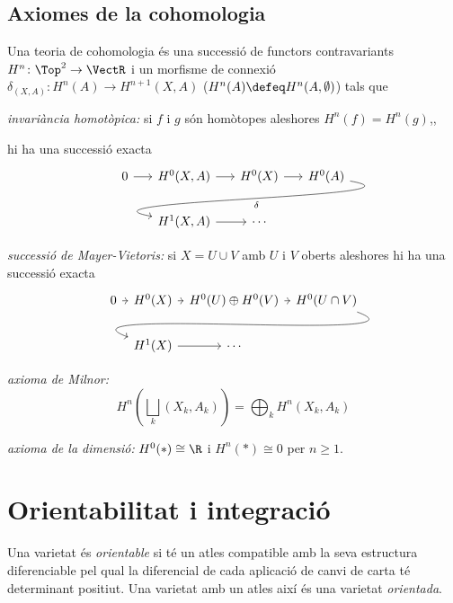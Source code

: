 \documentclass[12pt,twocolumn]{article}
\begin{document}
\subsection{Axiomes de la cohomologia}
Una teoria de cohomologia és una successió de functors contravariants \( H^n \colon \Top^2
\to \VectR \) i un morfisme de connexió \( \delta_{(X,A)} \colon H^n(A) \to
H^{n+1}(X,A) \) (\( H^n(A) \defeq H^n(A,\emptyset) \)) tals que   
\begin{points}
\item \emph{invariància homotòpica:} si \( f \) i \( g \) són homòtopes aleshores \( H^n(f) = H^n(g) \),,
\item hi ha una successió exacta
	\begin{equation*}
		\begin{tikzcd}[column sep = 15]
			0 \arrow[r] & H^0(X,A) \arrow[r] & H^0(X) \arrow[r] & H^0(A) \arrow[dll, "\delta",
			out = -10, in = 170, looseness = 1.2, overlay] \\
				& H^1(X,A) \arrow[r] & \cdots
		\end{tikzcd}
	\end{equation*}
\item \emph{successió de Mayer-Vietoris:} si \( X = U \cup V \) amb \( U \) i \( V \)
	oberts aleshores hi ha una successió exacta	
	\begin{equation*}
		\begin{tikzcd}[column sep = 5]
			0 \arrow[r] & H^0(X) \arrow[r] & H^0(U) \oplus H^0(V) \arrow[r] & H^0(U \cap V)
			\arrow[dll,	out = -20, in = 160, overlay] \\
									& H^1(X) \arrow[r] & \cdots
		\end{tikzcd}
	\end{equation*}
\item \emph{axioma de Milnor:} 
	\begin{equation*}
		H^n\left(\bigsqcup_{k}(X_k, A_k)\right) = \bigoplus_{k}H^n(X_k,A_k) 
	\end{equation*}
\item \emph{axioma de la dimensió:} \( H^0(\ast) \cong \R \) i \( H^n(\ast) \cong 0 \) per
	\( n \geq 1 \). 
	
\end{points}

\section{Orientabilitat i integració}
\begin{definition}[Orientabilitat]
	Una varietat és \emph{orientable} si té un atles compatible amb la seva estructura
	diferenciable pel qual la diferencial de cada aplicació de canvi de carta té determinant
	positiut. Una varietat amb un atles així és una varietat \emph{orientada}. 
\end{definition}
\end{document}
